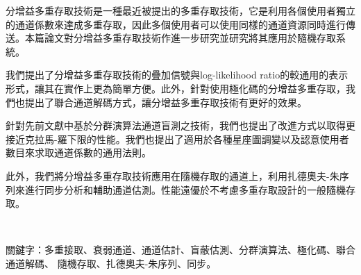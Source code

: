 \begin{abstractCH}

分增益多重存取技術是一種最近被提出的多重存取技術，它是利用各個使用者獨立的通道係數來達成多重存取，因此多個使用者可以使用同樣的通道資源同時進行傳送。本篇論文對分增益多重存取技術作進一步研究並研究將其應用於隨機存取系統。

我們提出了分增益多重存取技術的疊加信號與log-likelihood ratio的較通用的表示形式，讓其在實作上更為簡單方便。此外，針對使用極化碼的分增益多重存取，我們也提出了聯合通道解碼方式，讓分增益多重存取技術有更好的效果。

針對先前文獻中基於分群演算法通道盲測之技術，我們也提出了改進方式以取得更接近克拉馬-羅下限的性能。我們也提出了適用於各種星座圖調變以及認意使用者數目來求取通道係數的通用法則。

此外，我們將分增益多重存取技術應用在隨機存取的通道上，利用扎德奧夫-朱序列來進行同步分析和輔助通道估測。性能遠優於不考慮多重存取設計的一般隨機存取。

\

關鍵字：多重接取、衰弱通道、通道估計、盲蔽估測、分群演算法、極化碼、聯合通道解碼、 隨機存取、扎德奧夫-朱序列、同步。

\end{abstractCH}
